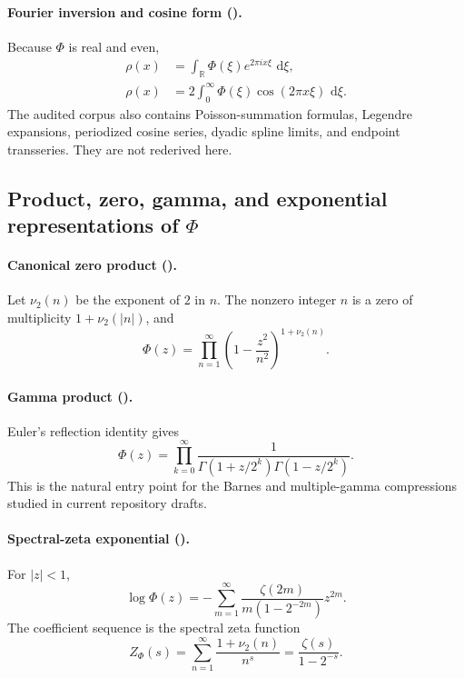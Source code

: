 \documentclass[11pt,oneside]{article}
\theoremstyle{definition}
\newcommand{\dd}{\,\mathrm d}
\newcommand{\R}{\mathbb R}
\begin{document}
\paragraph{Fourier inversion and cosine form (\statusknownPartl).}
Because \(\Phi\) is real and even,
\begin{align}
 \rho(x)&=\int_{\R}\Phi(\xi)e^{2\pi i x\xi}\,\dd\xi,
                                                                  \label{p3:eq:rho-fourier-inversion}\\
 \rho(x)&=2\int_0^{\infty}\Phi(\xi)\cos(2\pi x\xi)\,\dd\xi.
                                                                  \label{p3:eq:rho-cosine}
\end{align}
The audited corpus also contains Poisson-summation formulas, Legendre expansions,
periodized cosine series, dyadic spline limits, and endpoint transseries.  They are not
rederived here.

\subsection{Product, zero, gamma, and exponential representations of \(\Phi\)}

\paragraph{Canonical zero product (\statusknownPartl).}
Let \(\nu_2(n)\) be the exponent of \(2\) in \(n\).  The nonzero integer \(n\) is a zero of
multiplicity \(1+\nu_2(|n|)\), and
\begin{equation}
 \Phi(z)=\prod_{n=1}^{\infty}
 \left(1-\frac{z^2}{n^2}\right)^{1+\nu_2(n)}.                \label{p3:eq:canonical-product}
\end{equation}

\paragraph{Gamma product (\statusderivedPartl).}
Euler's reflection identity gives
\begin{equation}
 \Phi(z)=\prod_{k=0}^{\infty}
 \frac{1}{\Gamma(1+z/2^k)\Gamma(1-z/2^k)}.                  \label{p3:eq:gamma-product}
\end{equation}
This is the natural entry point for the Barnes and multiple-gamma compressions studied in
current repository drafts.

\paragraph{Spectral-zeta exponential (\statusknownPartl).}
For \(|z|<1\),
\begin{equation}
 \log\Phi(z)
 =-\sum_{m=1}^{\infty}
 \frac{\zeta(2m)}{m(1-2^{-2m})}z^{2m}.                       \label{p3:eq:logPhi-zeta}
\end{equation}
The coefficient sequence is the spectral zeta function
\begin{equation}
 Z_{\Phi}(s)=\sum_{n=1}^{\infty}\frac{1+\nu_2(n)}{n^s}
 =\frac{\zeta(s)}{1-2^{-s}}.                                \label{p3:eq:spectral-zeta}
\end{equation}
\end{document}
